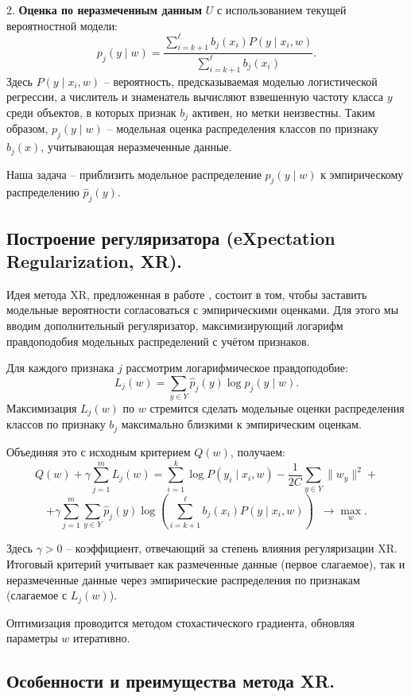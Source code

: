 2. \textbf{Оценка по неразмеченным данным} $U$ с использованием текущей вероятностной модели:
\[
    p_j(y \mid w) = \frac{\sum_{i=k+1}^{\ell} b_j(x_i) P(y \mid x_i, w)}{\sum_{i=k+1}^{\ell} b_j(x_i)}.
\]
Здесь $P(y \mid x_i, w)$ – вероятность, предсказываемая моделью логистической регрессии, а числитель и знаменатель вычисляют взвешенную частоту класса $y$ среди объектов, в которых признак $b_j$ активен, но метки неизвестны. Таким образом, $p_j(y \mid w)$ – модельная оценка распределения классов по признаку $b_j(x)$, учитывающая неразмеченные данные.

Наша задача – приблизить модельное распределение $p_j(y \mid w)$ к эмпирическому распределению $\hat{p}_j(y)$.

\subsection{Построение регуляризатора (eXpectation Regularization, XR).}

Идея метода XR, предложенная в работе \cite{mann2007simple}, состоит в том, чтобы заставить модельные вероятности согласоваться с эмпирическими оценками. Для этого мы вводим дополнительный регуляризатор, максимизирующий логарифм правдоподобия модельных распределений с учётом признаков.

Для каждого признака $j$ рассмотрим логарифмическое правдоподобие:
\[
    L_j(w) = \sum_{y \in Y} \hat{p}_j(y) \log p_j(y \mid w).
\]
Максимизация $L_j(w)$ по $w$ стремится сделать модельные оценки распределения классов по признаку $b_j$ максимально близкими к эмпирическим оценкам.

Объединяя это с исходным критерием $Q(w)$, получаем:
\[
    Q(w) + \gamma \sum_{j=1}^m L_j(w) = \sum_{i=1}^k \log P(y_i \mid x_i, w)
    - \frac{1}{2C}\sum_{y \in Y}\|w_y\|^2 +
\]
\[
    + \gamma \sum_{j=1}^m \sum_{y \in Y} \hat{p}_j(y)\log\left(\sum_{i=k+1}^{\ell} b_j(x_i)P(y \mid x_i, w)\right) \;\; \to \max_w.
\]

Здесь $\gamma > 0$ – коэффициент, отвечающий за степень влияния регуляризации XR. Итоговый критерий учитывает как размеченные данные (первое слагаемое), так и неразмеченные данные через эмпирические распределения по признакам (слагаемое с $L_j(w)$).

Оптимизация проводится методом стохастического градиента, обновляя параметры $w$ итеративно.

\subsection{Особенности и преимущества метода XR.}

